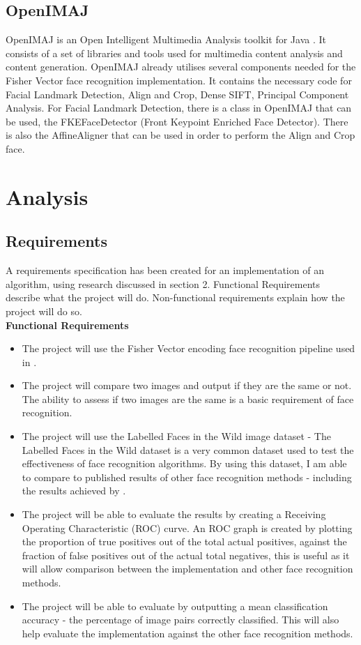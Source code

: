 \documentclass[12pt, a4paper]{article}
\begin{document}
\subsection{OpenIMAJ}
OpenIMAJ is an Open Intelligent Multimedia Analysis toolkit for Java \cite{openimaj}. It consists of a set of libraries and tools used for multimedia content analysis and content generation. OpenIMAJ already utilises several components needed for the Fisher Vector face recognition implementation. It contains the necessary code for Facial Landmark Detection, Align and Crop,  Dense SIFT, Principal Component Analysis. 
For Facial Landmark Detection, there is a class in OpenIMAJ that can be used, the FKEFaceDetector (Front Keypoint Enriched Face Detector). There is also the AffineAligner that can be used in order to perform the Align and Crop face. 

\newpage
\section{Analysis}
\subsection{Requirements}
A requirements specification has been created for an implementation of an algorithm, using research discussed in section 2. Functional Requirements describe what the project will do. Non-functional requirements explain how the project will do so. \\

\textbf{Functional Requirements}
\begin{itemize}
\item The project will use the Fisher Vector encoding face recognition pipeline used in \cite{simonyan2004fisher}.
\item The project will compare two images and output if they are the same or not. The ability to assess if two images are the same is a basic requirement of face recognition.
\item The project will use the Labelled Faces in the Wild image dataset - The Labelled Faces in the Wild dataset is a very common dataset used to test the effectiveness of face recognition algorithms. By using this dataset, I am able to compare to published results of other face recognition methods - including the results achieved by \cite{simonyan2004fisher}.
\item The project will be able to evaluate the results by creating a Receiving Operating Characteristic (ROC) curve. An ROC graph is created by plotting the proportion of true positives out of the total actual positives, against the fraction of false positives out of the actual total negatives, this is useful as it will allow comparison between the implementation and other face recognition methods.
\item The project will be able to evaluate by outputting a mean classification accuracy - the percentage of image pairs correctly classified. This will also help evaluate the implementation against the other face recognition methods.
\end{itemize}
\end{document}
